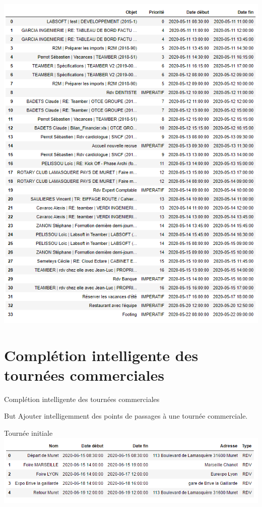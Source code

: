 \documentclass[french]{beamer}
\begin{document}
\begin{frame}
\includegraphics[width=0.9\textwidth>]{oedt2}
\end{frame}

\section{Complétion intelligente des tournées commerciales}
\begin{frame}{Complétion intelligente des tournées commerciales}
\begin{block}{But}
Ajouter intelligemment des points de passages à une tournée commerciale.
\end{block}
\end{frame}


\begin{frame}
\begin{block}{Tournée initiale}
\includegraphics[width=0.9\textwidth>]{dfrdv}
\end{block}
\end{frame}
\end{document}
